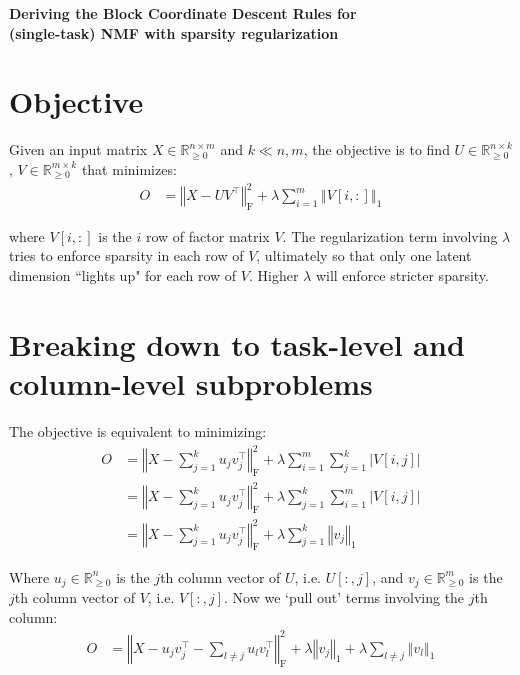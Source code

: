 \documentclass{article}
\begin{document}
\begin{center}
\textbf{\large{Deriving the Block Coordinate Descent Rules for\\(single-task) NMF with sparsity regularization}}
\end{center}
\smallskip
\section*{Objective}
Given an input matrix $X \in \mathbb{R}_{\geq 0}^{n \times m}$ and $k \ll n,m$, the objective is to find $U \in \mathbb{R}_{\geq 0}^{n \times k}$, $V \in \mathbb{R}_{\geq 0}^{m \times k}$ that minimizes:
\begin{align}
O &= 
\left\Vert X - U V^\top \right\Vert_\text{F}^2 
+  \lambda \sum_{i=1}^m \left\Vert V [i,:] \right\Vert_1
\end{align} 

where $V[i,:]$ is the $i$ row of factor matrix $V$. The regularization term involving $\lambda$ tries to enforce sparsity in each row of $V$, ultimately so that only one latent dimension ``lights up" for each row of $V$. Higher $\lambda$ will enforce stricter sparsity.

\medskip
\section*{Breaking down to task-level and column-level subproblems}

The objective is equivalent to minimizing:
\begin{align}
O &= 
\left\Vert X - \sum_{j=1}^k u_{j} v^{\top}_{j} \right\Vert_\text{F}^2 
+\lambda \sum_{i=1}^m \sum_{j=1}^k \left\lvert V[i,j] \right\rvert \\
&=
\left\Vert X - \sum_{j=1}^k u_{j} v^{\top}_{j} \right\Vert_\text{F}^2 
+\lambda \sum_{j=1}^k \sum_{i=1}^m \left\lvert V[i,j] \right\rvert \\
&=
\left\Vert X - \sum_{j=1}^k u_{j} v^{\top}_{j} \right\Vert_\text{F}^2 
+\lambda \sum_{j=1}^k \left\Vert v_j \right\Vert_1
\end{align}

Where $u_{j} \in \mathbb{R}^{n}_{\geq 0}$ is the $j$th column vector of $U$, i.e. $U[:,j]$, and  $v_{j}  \in \mathbb{R}^m_{\geq 0}$ is the $j$th column vector of $V$, i.e. $V [:,j]$. Now we `pull out' terms involving the $j$th column:
\begin{align}
O &= 
\left\Vert X -u_{j} v^{\top}_{j} - \sum_{l \neq j} u_{l} v^{\top}_{l} \right\Vert_\text{F}^2 
+\lambda\left\Vert v_j \right\Vert_1
+\lambda \sum_{l \neq j} \left\Vert v_l \right\Vert_1
\end{align}
\end{document}
